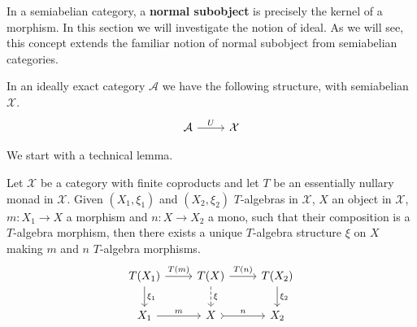In a semiabelian category, a \textbf{normal subobject} is precisely the kernel of a morphism. In this section we will investigate the notion of ideal. As we will see, this concept extends the familiar notion of normal subobject from semiabelian categories.

In an ideally exact category $\mathcal{A}$ we have the following structure, with semiabelian $\mathcal{X}$.
\[
\begin{tikzcd}
\mathcal{A} \arrow[r, "U"] & \mathcal{X}
\end{tikzcd}
\]

We start with a technical lemma.

\begin{mainbox}{}
    \begin{lemma}\label{induced algebra between morphisms}
        Let $\mathcal{X}$ be a category with finite coproducts and let $T$ be an essentially nullary monad in $\mathcal{X}$. Given $(X_1,\xi_1)$ and $(X_2,\xi_2)$ $T$-algebras in $\mathcal{X}$, $X$ an object in $\mathcal{X}$, $m: X_1 \to X$ a morphism and $n: X \to X_2$ a mono, such that their composition is a $T$-algebra morphism, then there exists a unique $T$-algebra structure $\xi$ on $X$ making $m$ and $n$ $T$-algebra morphisms.
        \begin{equation}\label{diag induced algebra between morphisms}
\begin{tikzcd}
T(X_1) \arrow[d, "\xi_1"] \arrow[r, "T(m)"] & T(X) \arrow[r, "T(n)"] \arrow[d, "\xi", dashed] & T(X_2) \arrow[d, "\xi_2"] \\
X_1 \arrow[r, "m"]                          & X \arrow[r, "n", tail]                          & X_2                      
\end{tikzcd}
        \end{equation}
    \end{lemma}
\end{mainbox}
